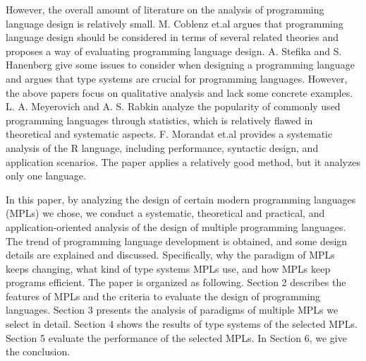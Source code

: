 However, the overall amount of literature on the analysis of
programming language design is relatively small.
M. Coblenz et.al argues that programming language design should be considered in terms
of several related theories and proposes a way of evaluating programming
language design\cite{coblenz2018interdisciplinary}.
A. Stefika and S. Hanenberg give some issues to consider when designing
a programming language and argues that type systems are crucial for
programming languages\cite{stefik2014programming}.
However, the above papers focus on qualitative analysis and lack
some concrete examples.
L. A. Meyerovich and A. S. Rabkin analyze the popularity of commonly
used programming languages through statistics, which is relatively
flawed in theoretical and systematic aspects\cite{meyerovich2013empirical}.
F. Morandat et.al provides a systematic analysis of the R language,
including performance, syntactic design, and application scenarios\cite{morandat2012evaluating}.
The paper applies a relatively good method, but it analyzes only one language.


In this paper, by analyzing the design of certain modern programming
languages (MPLs) we chose, we conduct a systematic, theoretical and practical,
and application-oriented analysis of the design of multiple programming languages.
The trend of programming language development is obtained, and some design
details are explained and discussed.
Specifically, why the paradigm of MPLs keeps changing, what kind of
type systems MPLs use, and how MPLs keep programs efficient.
The paper is organized as following.
Section 2 describes the features of MPLs and the criteria
to evaluate the design of programming languages.
Section 3 presents the analysis of paradigms of multiple MPLs we select in detail.
Section 4 shows the results of type systems of the selected MPLs.
Section 5 evaluate the performance of the selected MPLs.
In Section 6, we give the conclusion.
